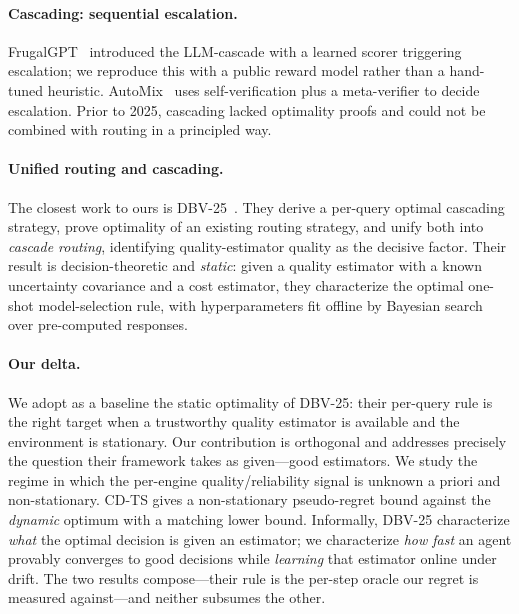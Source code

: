 \documentclass[11pt]{article}
\theoremstyle{definition}
\begin{document}
\paragraph{Cascading: sequential escalation.}
FrugalGPT~\cite{chen2023frugalgpt} introduced the LLM-cascade with a
learned scorer triggering escalation; we reproduce this with a public
reward model rather than a hand-tuned heuristic.
AutoMix~\cite{madaan2023automix} uses self-verification plus a meta-verifier
to decide escalation. Prior to 2025, cascading lacked optimality proofs and
could not be combined with routing in a principled way.

\paragraph{Unified routing and cascading.}
The closest work to ours is DBV-25~\cite{dekoninck2025unified}. They
derive a per-query optimal cascading strategy, prove optimality of an
existing routing strategy, and unify both into \emph{cascade routing},
identifying quality-estimator quality as the decisive factor.
Their result is decision-theoretic and \emph{static}: given a quality
estimator with a known uncertainty covariance and a cost estimator, they
characterize the optimal one-shot model-selection rule, with
hyperparameters fit offline by Bayesian search over pre-computed responses.

\paragraph{Our delta.}
We adopt as a baseline the static optimality of DBV-25: their per-query
rule is the right target when a trustworthy quality estimator is available
and the environment is stationary. Our contribution is orthogonal and
addresses precisely the question their framework takes as given---good
estimators. We study the regime in which the per-engine
quality/reliability signal is unknown a priori and non-stationary. CD-TS
gives a non-stationary pseudo-regret bound against the \emph{dynamic}
optimum with a matching lower bound. Informally, DBV-25 characterize
\emph{what} the optimal decision is given an estimator; we characterize
\emph{how fast} an agent provably converges to good decisions while
\emph{learning} that estimator online under drift. The two results
compose---their rule is the per-step oracle our regret is measured
against---and neither subsumes the other.
\end{document}
